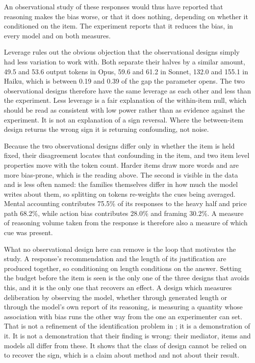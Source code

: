 An observational study of these responses would thus have reported that
reasoning makes the bias worse, or that it does nothing, depending on whether
it conditioned on the item. The experiment reports that it reduces the bias,
in every model and on both measures.

Leverage rules out the obvious objection that the observational designs
simply had less variation to work with. Both separate their halves by a
similar amount, 49.5 and 53.6 output tokens in Opus, 59.6 and 61.2 in Sonnet,
132.0 and 155.1 in Haiku, which is between 0.19 and 0.39 of the gap the
parameter opens. The two observational designs therefore have the same
leverage as each other and less than the experiment. Less leverage is a fair
explanation of the within-item null, which should be read as consistent with
low power rather than as evidence against the experiment. It is not an
explanation of a sign reversal. Where the between-item design returns the
wrong sign it is returning confounding, not noise.

Because the two observational designs differ only in whether the item is held
fixed, their disagreement locates that confounding in the item, and two item
level properties move with the token count. Harder items draw more words and
are more bias-prone, which is the reading above. The second is visible in the
data and is less often named: the families themselves differ in how much the
model writes about them, so splitting on tokens re-weights the cues being
averaged. Mental accounting contributes 75.5\% of its responses to the heavy
half and price path 68.2\%, while action bias contributes 28.0\% and framing
30.2\%. A measure of reasoning volume taken from the response is therefore
also a measure of which cue was present.

What no observational design here can remove is the loop that motivates the
study. A response's recommendation and the length of its justification are
produced together, so conditioning on length conditions on the answer.
Setting the budget before the item is seen is the only one of the three
designs that avoids this, and it is the only one that recovers an effect. A
design which measures deliberation by observing the model, whether through
generated length or through the model's own report of its reasoning, is
measuring a quantity whose association with bias runs the other way from the
one an experimenter can set. That is not a refinement of the identification
problem in \citet{bini2026behavioral}; it is a demonstration of it. It is not
a demonstration that their finding is wrong: their mediator, items and models
all differ from these. It shows that the class of design cannot be relied on
to recover the sign, which is a claim about method and not about their
result.
